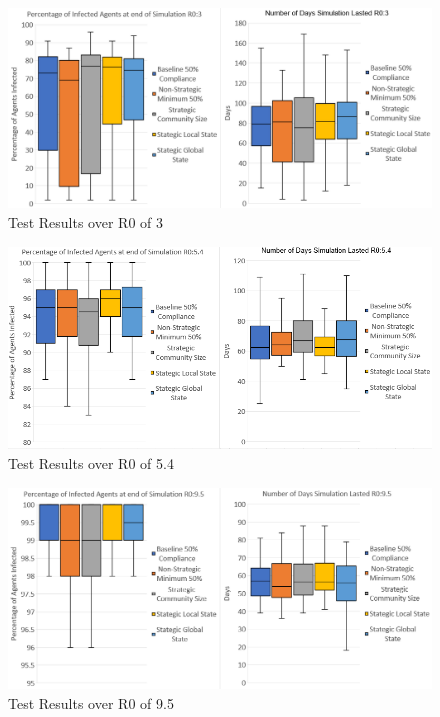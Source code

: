 \documentclass{article}
\begin{document}
\begin{figure}[h!]
\centering
\includegraphics[width=\textwidth]{4}
\caption{Test Results over R0 of 3}
\end{figure}

\newpage

\begin{figure}[h!]
\centering
\includegraphics[width=\textwidth]{3}
\caption{Test Results over R0 of 5.4}
\end{figure}

\begin{figure}[h!]
\centering
\includegraphics[width=\textwidth]{2}
\caption{Test Results over R0 of 9.5}
\end{figure}
\newpage
\end{document}

